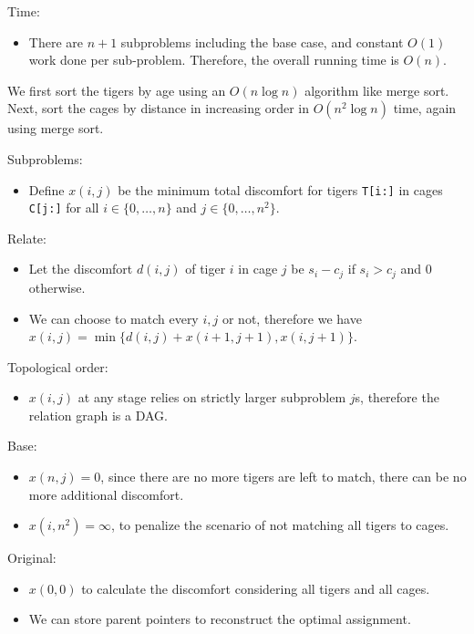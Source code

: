 \documentclass[12pt,twoside]{article}
\begin{document}
\begin{problems}
Time:
\begin{itemize}
    \item There are $n+1$ subproblems including the base case, and constant $O(1)$ work done per sub-problem. Therefore, the overall running time is $O(n)$.
\end{itemize}

\newpage
\problem  %
We first sort the tigers by age using an $O(n\log n)$ algorithm like merge sort. Next, sort the cages by distance in increasing order in $O(n^2\log n)$ time, again using merge sort.

Subproblems:
\begin{itemize}
    \item Define $x(i,j)$ be the minimum total discomfort for tigers \verb|T[i:]| in cages \verb|C[j:]| for all $i \in \{0,\ldots,n\}$ and $j \in \{0,\ldots,n^2\}$.
\end{itemize}

Relate:
\begin{itemize}
    \item Let the discomfort $d(i,j)$ of tiger $i$ in cage $j$ be $s_i-c_j$ if $s_i>c_j$ and 0 otherwise.
    \item We can choose to match every $i,j$ or not, therefore we have $x(i,j)=\min\{d(i,j)+x(i+1,j+1),x(i,j+1)\}$.
\end{itemize}

Topological order:
\begin{itemize}
    \item $x(i,j)$ at any stage relies on strictly larger subproblem $j$s, therefore the relation graph is a DAG.
\end{itemize}

Base:
\begin{itemize}
    \item $x(n,j)=0$, since there are no more tigers are left to match, there can be no more additional discomfort.
    \item $x(i,n^2)=\infty$, to penalize the scenario of not matching all tigers to cages.
\end{itemize}

Original:
\begin{itemize}
    \item $x(0,0)$ to calculate the discomfort considering all tigers and all cages.
    \item We can store parent pointers to reconstruct the optimal assignment.
\end{itemize}


\end{problems}
\end{document}
